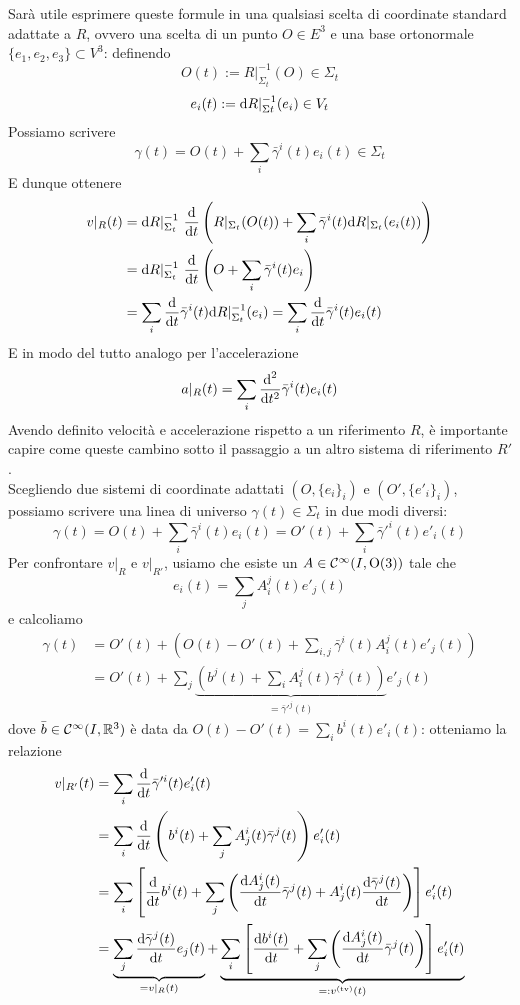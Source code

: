 \documentclass[openany]{book}
\renewcommand\C{\mc{C}}
\begin{document}
Sarà utile esprimere queste formule in una qualsiasi scelta di coordinate standard adattate a $R$, ovvero una scelta di un punto $O \in E^3$ e una base ortonormale $\{e_1,e_2,e_3\}\subset V^3$: definendo
\[ O(t):= R|_{\Sigma_t}^{-1}(O) \in \Sigma_t \]
\[ e_i(t) := \text{d} R|_{\Sigma t}^{-1}(e_i) \in V_t \]
Possiamo scrivere 
\[ \gamma(t) = O(t) + \sum_i \bar\gamma^i(t) e_i(t) \in \Sigma_t \]
E dunque ottenere
\begin{align*} 
    v|_R(t) & = \text{d} R|_{\Sigma_t}^{-1}\ \frac{\text{d}}{\text{d} t}\left( R|_{\Sigma_t}(O(t)) + \sum_i \bar\gamma^i(t) \text{d} R|_{\Sigma_t}(e_i(t)) \right) \\ & = \text{d} R|_{\Sigma_t}^{-1}\ \frac{\text{d}}{\text{d} t}\left( O + \sum_i\bar\gamma^i(t) e_i \right) \\ & = \sum_i \frac{\text{d}}{\text{d} t} \bar\gamma^i(t) \text{d} R|_{\Sigma_t}^{-1}(e_i) = \sum_i \frac{\text{d}}{\text{d} t} \bar\gamma^i(t)e_i(t)
\end{align*}
E in modo del tutto analogo per l'accelerazione 
\[ a|_R(t) = \sum_i \frac{\text{d}^2}{\text{d} t^2} \bar\gamma^i(t)e_i(t) \]
Avendo definito velocità e accelerazione rispetto a un riferimento $R$, è importante capire come queste cambino sotto il passaggio a un altro sistema di riferimento $R'$.\\
Scegliendo due sistemi di coordinate adattati $(O,\{e_i\}_i)$ e $(O', \{e'_i\}_i)$, possiamo scrivere una linea di universo $\gamma(t) \in \Sigma_t$ in due modi diversi:
\[ \gamma(t) = O(t) + \sum_i \bar\gamma^i(t) e_i(t) = O'(t) + \sum_i \bar\gamma'^i(t) e'_i(t) \]
Per confrontare $v|_R$ e $v|_{R'}$, usiamo che esiste un $A \in \C^\infty(I, \O(3))$ tale che 
\[ e_i(t) = \sum_j A_i^j(t) e'_j(t) \]
e calcoliamo 
\begin{align*} \gamma(t) & = O'(t) + \left( O(t)-O'(t) +\sum_{i,j} \bar\gamma^i(t) A_i^j(t) e'_j(t)  \right)\\ & = O'(t) + \sum_j\underbrace{\left( b^j(t) + \sum_i A_i^j(t)\bar\gamma^i(t) \right)}_{= \bar\gamma'^j(t)} e'_j(t) \end{align*}
dove $\bar b \in \C^{\infty}(I, \R^3)$ è data da $O(t)-O'(t) = \sum_i b^i(t)e'_i(t)$: otteniamo la relazione
\begin{align*}
    v|_{R'}(t) & = \sum_i \frac{\text{d}}{\text{d} t}\bar\gamma'^i(t) e'_i(t) \\ & = \sum_i\frac{\text{d}}{\text{d} t} \left( b^i(t) + \sum_j A^i_j(t)\bar\gamma^j(t) \right)e'_i(t) \\ & = \sum_i\left[ \frac{\text{d}}{\text{d} t} b^i(t) + \sum_j\left( \frac{\text{d} A^i_j(t) }{\text{d} t}\bar\gamma^j(t) + A^i_j(t) \frac{\text{d} \bar\gamma^j(t)}{\text{d} t} \right) \right] e'_i(t) \\ & = \underbrace{\sum_j \frac{\text{d} \bar\gamma^j(t)}{\text{d} t} e_j(t)}_{=v|_R(t)} + \underbrace{\sum_i \left[ \frac{\text{d} b^i(t)}{\text{d} t} + \sum_j\left( \frac{\text{d} A^i_j(t)}{\text{d} t} \bar\gamma^j(t) \right) \right]e'_i(t)}_{=: v^{\text{(tv)}} (t)}
\end{align*} 
\end{document}
